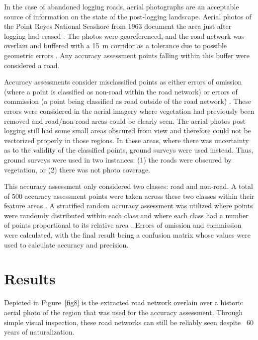 \documentclass[remotesensing,article,accept,pdftex,moreauthors]{Definitions/mdpi}
\begin{document}
In the case of abandoned logging roads, aerial photographs are an acceptable source of information on the state of the post-logging landscape. Aerial photos of the Point Reyes National Seashore from 1963 document the area just after logging had ceased \cite{becker}. The photos were georeferenced, and the road network was overlain and buffered with a 15~m corridor as a tolerance due to possible geometric errors \cite{zhen}. Any accuracy assessment points falling within this buffer were considered a road. 

Accuracy assessments consider misclassified points as either errors of omission (where a point is classified as non-road within the road network) or errors of commission (a point being classified as road outside of the road network) \cite{lillesand}. These errors were considered in the aerial imagery where vegetation had previously been removed and road/non-road areas could be clearly seen. The aerial photos post logging still had some small areas obscured from view and therefore could not be vectorized properly in those regions. In these areas, where there was uncertainty as to the validity of the classified points, ground surveys were used instead. Thus, ground surveys were used in two instances: (1) the roads were obscured by vegetation, or (2) there was not photo coverage.

This accuracy assessment only considered two classes: road and non-road.  A total of 500 accuracy assessment points were taken across these two classes within their feature areas \cite{guillen, lillesand}. A stratified random accuracy assessment was utilized where points were randomly distributed within each class and where each class had a number of points proportional to its relative area \cite{foody}. Errors of omission and commission were calculated, with the final result being a confusion matrix whose values were used to calculate accuracy and precision.
\section{Results}
Depicted in Figure~\ref{fig8} is the extracted road network overlain over a historic aerial photo of the region that was used for the accuracy assessment. Through simple visual inspection, these road networks can still be reliably seen despite ~60 years of naturalization.  
\end{document}
